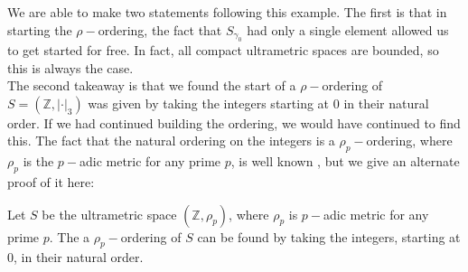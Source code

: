 We are able to make two statements following this example. The first is that in starting the $\rho-$ordering, the fact that $S_{\gamma_0}$ had only a single element allowed us to get started for free. In fact,  all compact ultrametric spaces are bounded, so this is always the case. \\

The second takeaway is that we found the start of a $\rho-$ordering of $S=(\mathbb{Z}, \lvert \cdot \rvert_3)$ was given by taking the integers starting at $0$ in their natural order. If we had continued building the ordering, we would have continued to find this. The fact that the natural ordering on the integers is a $\rho_p-$ordering, where $\rho_p$ is the $p-$adic metric for any prime $p$, is well known \cite{mb1}, but we give an alternate proof of it here:\\ 

\begin{corollary} 
Let $S$ be the ultrametric space $(\mathbb{Z}, \rho_p)$, where $\rho_p$ is  $p-$adic metric for any prime $p$. The a $\rho_p-$ordering of $S$ can be found by taking the integers, starting at $0$, in their natural order.
\end{corollary}

